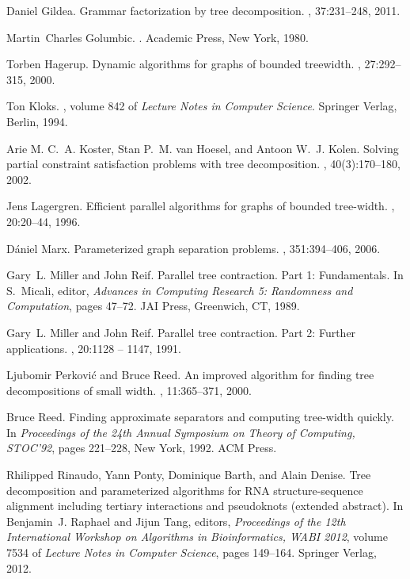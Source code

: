 \documentclass[a4paper,11pt]{article}
\theoremstyle{definition}
\theoremstyle{remark}
\begin{document}
\begin{thebibliography}{10}
Daniel Gildea.
\newblock Grammar factorization by tree decomposition.
, 37:231--248, 2011.

Martin~Charles Golumbic.
.
\newblock Academic Press, New York, 1980.

Torben Hagerup.
\newblock Dynamic algorithms for graphs of bounded treewidth.
, 27:292--315, 2000.

Ton Kloks.
, volume 842 of {\em
  Lecture Notes in Computer Science}.
\newblock Springer Verlag, Berlin, 1994.

Arie M. C.~A. Koster, Stan P.~M. van Hoesel, and Antoon W.~J. Kolen.
\newblock Solving partial constraint satisfaction problems with tree
  decomposition.
, 40(3):170--180, 2002.

Jens Lagergren.
\newblock Efficient parallel algorithms for graphs of bounded tree-width.
, 20:20--44, 1996.

D\'{a}niel Marx.
\newblock Parameterized graph separation problems.
, 351:394--406, 2006.

Gary~L. Miller and John Reif.
\newblock Parallel tree contraction. {P}art 1: {F}undamentals.
\newblock In S.~Micali, editor, {\em Advances in Computing Research 5:
  Randomness and Computation}, pages 47--72. JAI Press, Greenwich, CT, 1989.

Gary~L. Miller and John Reif.
\newblock Parallel tree contraction. {P}art 2: {F}urther applications.
, 20:1128 -- 1147, 1991.

Ljubomir Perkovi{\'{c}} and Bruce Reed.
\newblock An improved algorithm for finding tree decompositions of small width.
,
  11:365--371, 2000.

Bruce Reed.
\newblock Finding approximate separators and computing tree-width quickly.
\newblock In {\em Proceedings of the 24th Annual Symposium on Theory of
  Computing, STOC'92}, pages 221--228, New York, 1992. ACM Press.

Rhilipped Rinaudo, Yann Ponty, Dominique Barth, and Alain Denise.
\newblock Tree decomposition and parameterized algorithms for {RNA}
  structure-sequence alignment including tertiary interactions and pseudoknots
  (extended abstract).
\newblock In Benjamin~J. Raphael and Jijun Tang, editors, {\em Proceedings of
  the 12th International Workshop on Algorithms in Bioinformatics, WABI 2012},
  volume 7534 of {\em Lecture Notes in Computer Science}, pages 149--164.
  Springer Verlag, 2012.


\end{thebibliography}
\end{document}
